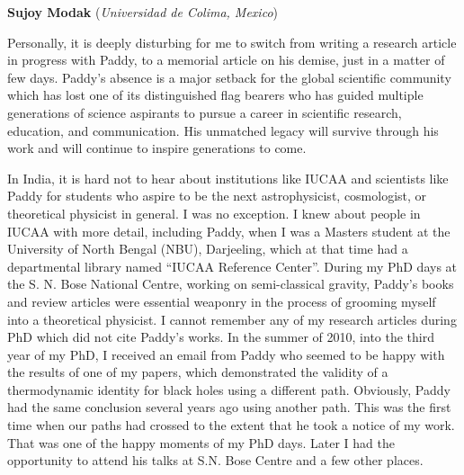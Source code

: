 \documentclass[prd, preprint, longbibliography, 11pt]{revtex4-1}
\begin{document}
\bigskip

\bigskip

\centerline{{\bf Sujoy Modak} ({\it Universidad de Colima, Mexico})}
\medskip
{}

\noindent Personally, it is deeply disturbing for me to switch from writing a research article in progress with Paddy, to a memorial article on his demise, just in a matter of few days. Paddy’s absence is a major setback for the global scientific community which has lost one of its distinguished flag bearers who has guided multiple generations of science aspirants to pursue a career in scientific research, education, and communication. His unmatched legacy will survive through his work and will continue to inspire generations to come.

In India, it is hard not to hear about  institutions like IUCAA and scientists like Paddy for students who aspire to be the next astrophysicist, cosmologist, or theoretical physicist in general. I was no exception. I knew about people in IUCAA with more detail, including Paddy, when I was a Masters student at the University of North Bengal (NBU), Darjeeling, which at that time had a departmental library named “IUCAA Reference Center”. During my PhD days at the S. N. Bose National Centre, working on semi-classical gravity, Paddy’s books and review articles were essential weaponry in the process of grooming myself into a theoretical physicist. I cannot remember any of my research articles during PhD which did not cite Paddy’s works. In the summer of 2010, into the third year of my PhD, I received an email from Paddy who seemed to be happy with the results of one of my papers, which demonstrated the validity of a thermodynamic identity for black holes using a different path. Obviously, Paddy had the same conclusion several years ago using another path. This was the first time when our paths had crossed to the extent that he took a notice of my work. That was one of the happy moments of my PhD days. Later I had the opportunity to attend his talks at S.N. Bose Centre and a few other places.
\end{document}
